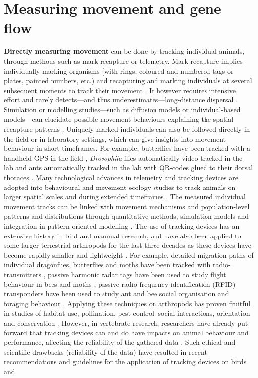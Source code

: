 \documentclass[10pt, twoside]{book} %
\begin{document}
	\section{Measuring movement and gene flow}\label{measuringmovement}
	\textbf{Directly measuring movement} can be done by tracking individual animals, through methods such as mark-recapture or telemetry. Mark-recapture implies individually marking organisms (with rings, coloured and numbered tags or plates, painted numbers, etc.) and recapturing and marking individuals at several subsequent moments to track their movement \citep[e.g.][]{roland2000, bowne2004}. It however requires intensive effort and rarely detects---and thus underestimates---long-distance dispersal \citep{hassall2012, ugelvig2012, trense2021}. Simulation or modelling studies---such as diffusion models or individual-based models---can elucidate possible movement behaviours explaining the spatial recapture patterns \citep{ovaskainen2008}. Uniquely marked individuals can also be followed directly in the field or in laboratory settings, which can give insights into movement behaviour in short timeframes. For example, butterflies have been tracked with a handheld GPS in the field \citep{fernandez2016}, \textit{Drosophila} flies automatically video-tracked in the lab \citep{branson2009} and ants automatically tracked in the lab with QR-codes glued to their dorsal thoraces \citep{mersch2013, stroeymeyt2018}. Many technological advances in telemetry and tracking devices are adopted into behavioural and movement ecology studies to track animals on larger spatial scales and during extended timeframes \citep{kays2015}. The measured individual movement tracks can be linked with movement mechanisms and population-level patterns and distributions through quantitative methods, simulation models and integration in pattern-oriented modelling \citep{mueller2008}. The use of tracking devices has an extensive history in bird and mammal research, and have also been applied to some larger terrestrial arthropods for the last three decades as these devices have become rapidly smaller and lightweight \citep{kissling2014, portugal2018}. For example, detailed migration paths of individual dragonflies, butterflies and moths have been tracked with radio-transmitters \citep{wikelski2006, knight2019, menz2022}, passive harmonic radar tags have been used to study flight behaviour in bees and moths \citep{riley1998, capaldi2000}, passive radio frequency identification (RFID) transponders have been used to study ant and bee social organisation and foraging behaviour \citep{robinson2009, ohashi2010, vanoystaeyen2013}. Applying these techniques on arthropods has proven fruitful in studies of habitat use, pollination, pest control, social interactions, orientation and conservation \citep{kissling2014}. However, in vertebrate research, researchers have already put forward that tracking devices can and do have impacts on animal behaviour and performance, affecting the reliability of the gathered data \citep{mech2002, godfrey2003, barron2010, mcintyre2015, bodey2018, portugal2018, geen2019}. Such ethical and scientific drawbacks (reliability of the data) have resulted in recent recommendations and guidelines for the application of tracking devices on birds and 
\end{document}
